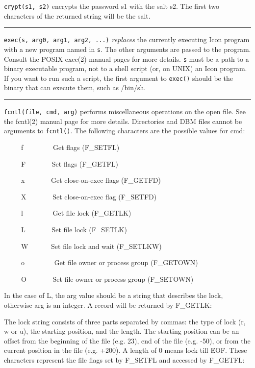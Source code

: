 \noindent
\texttt{crypt(s1, s2)} encrypts the password s1 with the salt s2. The first two
characters of the returned string will be the salt.

\bigskip\hrule\vspace{0.1cm}

\noindent
\texttt{exec(s, arg0, arg1, arg2, ...)}
\textit{replaces} the currently executing
Icon program with a new program named in \texttt{s}. The other arguments are
passed to the program. Consult the POSIX exec(2) manual pages for more
details. \texttt{s} must be a path to a binary executable program, not
to a shell script (or, on UNIX) an Icon program. If you want to run
such a script, the first argument to \texttt{exec()} should be the binary that
can execute them, such as /bin/sh.

\bigskip\hrule\vspace{0.1cm}

\noindent
\texttt{fcntl(file, cmd, arg)} performs miscellaneous operations on the open
file. See the fcntl(2) manual page for more details. Directories and
DBM files cannot be arguments to \texttt{fcntl()}. The following characters are
the possible values for cmd: 

\ \ \ \ \ f \ \ \ \ \ \ \ \ Get flags (F\_SETFL)

\ \ \ \ \ F \ \ \ \ \ \ \ Set flags (F\_GETFL)

\ \ \ \ \ x \ \ \ \ \ \ \ Get close-on-exec flags (F\_GETFD)

\ \ \ \ \ X \ \ \ \ \ \ \ Set close-on-exec flag (F\_SETFD)

\ \ \ \ \ l \ \ \ \ \ \ \ \ Get file lock (F\_GETLK)

\ \ \ \ \ L \ \ \ \ \ \ \ Set file lock (F\_SETLK)

\ \ \ \ \ W \ \ \ \ \ \ Set file lock and wait (F\_SETLKW)

\ \ \ \ \ o \ \ \ \ \ \ \ \ Get file owner or process group (F\_GETOWN)

\ \ \ \ \ O \ \ \ \ \ \ \ Set file owner or process group (F\_SETOWN)

In the case of L, the arg value should be a string that describes the
lock, otherwise arg is an integer. A record will be returned by
F\_GETLK: 


The lock string consists of three parts separated by commas: the type of
lock (r, w or u), the starting position, and the length. The starting
position can be an offset from the beginning of the file (e.g. 23), end
of the file (e.g. -50), or from the current position in the file (e.g.
+200). A length of 0 means lock till EOF. These characters represent
the file flags set by F\_SETFL and accessed by F\_GETFL: 

